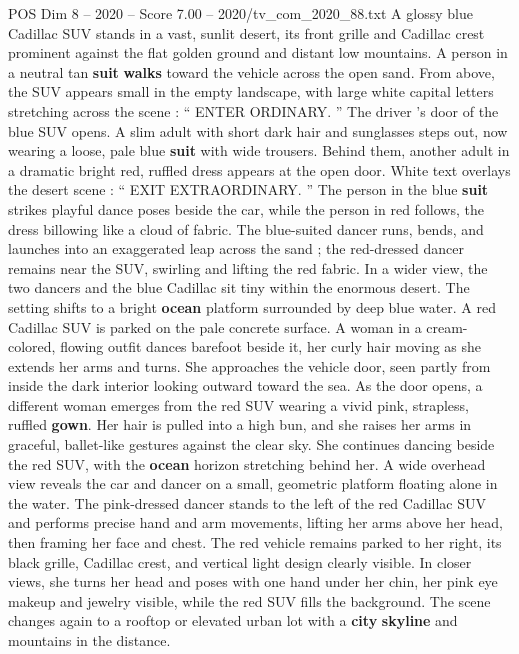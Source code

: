 \begin{textsample}{POS Dim 8 – 2020 – Score 7.00 – 2020/tv\_com\_2020\_88.txt}  \label{ex:f8_pos_053}
A glossy blue Cadillac SUV stands in a vast, sunlit desert, its front grille and Cadillac crest prominent against the flat golden ground and distant low mountains.
A person in a neutral tan \textbf{suit} \textbf{walks} toward the vehicle across the open sand.
From above, the SUV appears small in the empty landscape, with large white capital letters stretching across the scene : “ ENTER ORDINARY. ” The driver ’s door of the blue SUV opens.
A slim adult with short dark hair and sunglasses steps out, now wearing a loose, pale blue \textbf{suit} with wide trousers.
Behind them, another adult in a dramatic bright red, ruffled dress appears at the open door.
White text overlays the desert scene : “ EXIT EXTRAORDINARY. ” The person in the blue \textbf{suit} strikes playful dance poses beside the car, while the person in red follows, the dress billowing like a cloud of fabric.
The blue-suited dancer runs, bends, and launches into an exaggerated leap across the sand ; the red-dressed dancer remains near the SUV, swirling and lifting the red fabric.
In a wider view, the two dancers and the blue Cadillac sit tiny within the enormous desert.
The setting shifts to a bright \textbf{ocean} platform surrounded by deep blue water.
A red Cadillac SUV is parked on the pale concrete surface.
A woman in a cream-colored, flowing outfit dances barefoot beside it, her curly hair moving as she extends her arms and turns.
She approaches the vehicle door, seen partly from inside the dark interior looking outward toward the sea.
As the door opens, a different woman emerges from the red SUV wearing a vivid pink, strapless, ruffled \textbf{gown}.
Her hair is pulled into a high bun, and she raises her arms in graceful, ballet-like gestures against the clear sky.
She continues dancing beside the red SUV, with the \textbf{ocean} horizon stretching behind her.
A wide overhead view reveals the car and dancer on a small, geometric platform floating alone in the water.
The pink-dressed dancer stands to the left of the red Cadillac SUV and performs precise hand and arm movements, lifting her arms above her head, then framing her face and chest.
The red vehicle remains parked to her right, its black grille, Cadillac crest, and vertical light design clearly visible.
In closer views, she turns her head and poses with one hand under her chin, her pink eye makeup and jewelry visible, while the red SUV fills the background.
The scene changes again to a rooftop or elevated urban lot with a \textbf{city} \textbf{skyline} and mountains in the distance.

\end{textsample}

